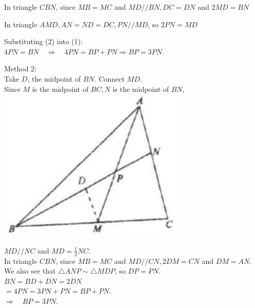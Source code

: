 \documentclass{article}
\begin{document}
In triangle \(C B N\), since \(M B=M C\) and \(M D / / B N, D C=D N\) and \(2 M D=B N\)

In triangle \(A M D, A N=N D=D C, P N / / M D\), so \(2 P N=M D\)

Substituting (2) into (1):\\
\(4 P N=B N \quad \Rightarrow \quad 4 P N=B P+P N \Rightarrow B P=3 P N\).

Method 2:\\
Take \(D\), the midpoint of \(B N\). Connect \(M D\).\\
Since \(M\) is the midpoint of \(B C, N\) is the midpoint of \(B N\),\\
\centering
\includegraphics[width=\textwidth]{images/047(1).jpg}


\(M D / / N C\) and \(M D=\frac{1}{2} N C\).\\
In triangle \(C B N\), since \(M B=M C\) and \(M D / / C N, 2 D M=C N\) and \(D M=A N\).\\
We also see that \(\triangle A N P \sim \triangle M D P\), so \(D P=P N\).\\
\(B N=B D+D N=2 D N\)\\
\(=4 P N=3 P N+P N=B P+P N\).\\
\(\Rightarrow \quad B P=3 P N\).
\end{document}
